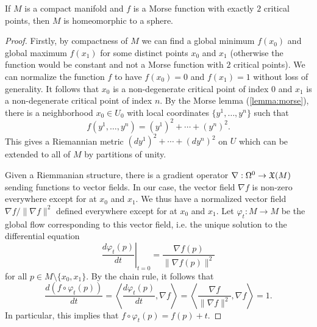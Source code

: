 \begin{theorem}[Reeb]\label{thm:reeb}
	If $M$ is a compact manifold and $f$ is a Morse function with exactly $2$ critical points, then $M$ is homeomorphic to a sphere.
\end{theorem}
\begin{proof}
	Firstly, by compactness of $M$ we can find a global minimum $f(x_0)$ and global maximum $f(x_1)$ for some distinct points $x_0$ and $x_1$ (otherwise the function would be constant and not a Morse function with $2$ critical points). We can normalize the function $f$ to have $f(x_0)=0$ and $f(x_1)=1$ without loss of generality. It follows that $x_0$ is a non-degenerate critical point of index 0 and $x_1$ is a non-degenerate critical point of index $n$.
	By the Morse lemma (\ref{lemma:morse}), there is a neighborhood $x_0\in U_0$ with local coordinates $\{y^1,\ldots, y^n\}$ such that
	\begin{equation}
		f(y^1,\ldots, y^n) = (y^1)^2 + \cdots + (y^n)^2.
	\end{equation}
	This gives a Riemannian metric $(dy^1)^2+\cdots+(dy^n)^2$ on $U$ which can be extended to all of $M$ by partitions of unity.

	Given a Riemmanian structure, there is a gradient operator $\nabla : \Omega^0 \to \operatorname{\mathfrak{X}}(M)$ sending functions to vector fields.
	In our case, the vector field $\nabla f$ is non-zero everywhere except for at $x_0$ and $x_1$. We thus have a normalized vector field $\nabla f/\|\nabla f\|^2$
	defined everywhere except for at $x_0$ and $x_1$. Let $\varphi_t : M \to M$ be the global flow corresponding to this vector field, i.e. the unique solution to the differential equation
	\begin{equation}
		\left.\frac{d\varphi_t(p)}{dt}\right|_{t=0} = \frac{\nabla f(p)}{\|\nabla f(p)\|^2}
	\end{equation}
	for all $p\in M\setminus \{x_0,x_1\}$. By the chain rule, it follows that
	\begin{equation}
		\frac{d(f\circ \varphi_t(p))}{dt}=\left\langle \frac{d\varphi_t(p)}{dt}, \nabla f\right\rangle = \left\langle \frac{\nabla f}{\|\nabla f\|^2}, \nabla f\right\rangle=1.
	\end{equation}
	In particular, this implies that $f\circ \varphi_t(p) = f(p)+t$.

\end{proof}

